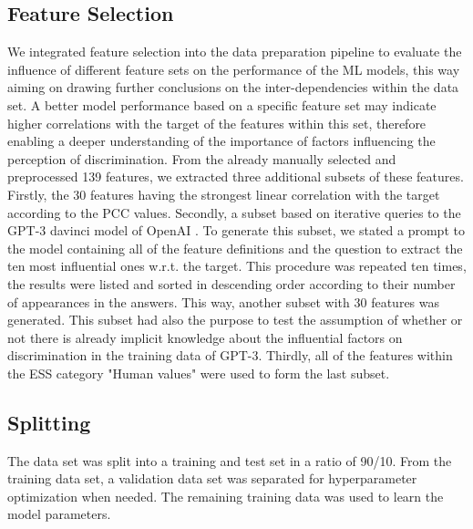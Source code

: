 \documentclass[10pt]{article}
\begin{document}
	\subsection{Feature Selection} %
	\label{ssec:features}
	We integrated feature selection into the data preparation pipeline to evaluate the influence of different feature sets on the performance of the ML models, this way aiming on drawing further conclusions on the inter-dependencies within the data set. A better model performance based on a specific feature set may indicate higher correlations with the target of the features within this set, therefore enabling a deeper understanding of the importance of factors influencing the perception of discrimination.
	From the already manually selected and preprocessed 139 features, we extracted three additional subsets of these features. Firstly, the 30 features having the strongest linear correlation with the target according to the PCC values. Secondly, a subset based on iterative queries to the GPT-3 davinci model of OpenAI \cite{brown:2020}. To generate this subset, we stated a prompt to the model containing all of the feature definitions and the question to extract the ten most influential ones w.r.t. the target. This procedure was repeated ten times, the results were listed and sorted in descending order according to their number of appearances in the answers. This way, another subset with 30 features was generated. This subset had also the purpose to test the assumption of whether or not there is already implicit knowledge about the influential factors on discrimination in the training data of GPT-3. Thirdly, all of the features within the ESS category "Human values" were used to form the last subset. 
	
	\subsection{Splitting} 
	The data set was split into a training and test set in a ratio of 90/10. From the training data set, a validation data set was separated for hyperparameter optimization when needed. The remaining training data was used to learn the model parameters.
	
\end{document}
